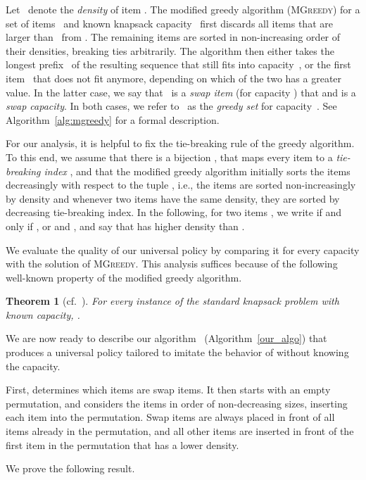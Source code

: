 \documentclass[11pt]{article}
\newtheorem{theorem}{Theorem}
\begin{document}
Let~ denote the \emph{density} of item . The
modified greedy algorithm (\textsc{MGreedy}) for a set of items~
and known knapsack capacity~ first discards all items that are
larger than~ from . The remaining items are sorted
in non-increasing order of their densities, breaking ties arbitrarily.
The algorithm then either takes the longest prefix~ of the resulting
sequence that still fits into capacity~, or the first item~
that does not fit anymore, depending on which of the two has a greater
value. In the latter case, we say that~ is a \emph{swap item}
(for capacity ) that and  is a \emph{swap capacity}. In both
cases, we refer to~ as the \emph{greedy set} for capacity~.
See Algorithm~\ref{alg:mgreedy} for a formal description. 

For our analysis, it is helpful to fix the tie-breaking rule of the
greedy algorithm. To this end, we assume that there is a bijection
, that maps every item  to a \emph{tie-breaking
index} , and that the modified greedy algorithm initially sorts
the items decreasingly with respect to the tuple ,
i.e., the items are sorted non-increasingly by density and whenever
two items have the same density, they are sorted by decreasing tie-breaking
index. In the following, for two items , we write 
if and only if , or  and , and
say that  has higher density than .

We evaluate the quality of our universal policy by comparing it for
every capacity with the solution of \textsc{MGreedy}. This analysis
suffices because of the following well-known property of the modified
greedy algorithm.
\begin{theorem}
[cf.~\cite{korteV02}] For every instance  of the
standard knapsack problem with known capacity, .\label{thm:greedy}

\end{theorem}
We are now ready to describe our algorithm ~(Algorithm~\ref{our_algo})
that produces a universal policy tailored to imitate the behavior
of  without knowing the capacity. 

First,  determines which items are swap items.
It then starts with an empty permutation, and considers the items
in order of non-decreasing sizes, inserting each item into the permutation.
Swap items are always placed in front of all items already in the
permutation, and all other items are inserted in front of the first
item in the permutation that has a lower density.

We prove the following result.
\end{document}

